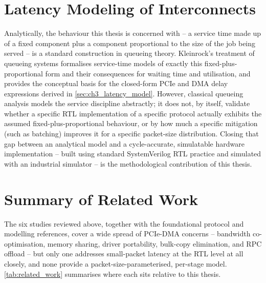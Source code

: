 
\section{Latency Modeling of Interconnects}
\label{sec:ch2_latency_modeling}

Analytically, the behaviour this thesis is concerned with -- a service time made up of a fixed component plus a component proportional to the size of the job being served -- is a standard construction in queueing theory. Kleinrock's treatment of queueing systems \cite{kleinrock1975queueing} formalises service-time models of exactly this fixed-plus-proportional form and their consequences for waiting time and utilisation, and provides the conceptual basis for the closed-form PCIe and DMA delay expressions derived in \autoref{sec:ch3_latency_model}. However, classical queueing analysis models the service discipline abstractly; it does not, by itself, validate whether a specific RTL implementation of a specific protocol actually exhibits the assumed fixed-plus-proportional behaviour, or by how much a specific mitigation (such as batching) improves it for a specific packet-size distribution. Closing that gap between an analytical model and a cycle-accurate, simulatable hardware implementation -- built using standard SystemVerilog RTL practice \cite{ieee2017systemverilog} and simulated with an industrial simulator \cite{xilinx2022vivadosim} -- is the methodological contribution of this thesis.


\section{Summary of Related Work}
\label{sec:ch2_summary}

The six studies reviewed above, together with the foundational protocol and modelling references, cover a wide spread of PCIe-DMA concerns -- bandwidth co-optimisation, memory sharing, driver portability, bulk-copy elimination, and RPC offload -- but only one addresses small-packet latency at the RTL level at all closely, and none provide a packet-size-parameterised, per-stage model. \autoref{tab:related_work} summarises where each sits relative to this thesis.

